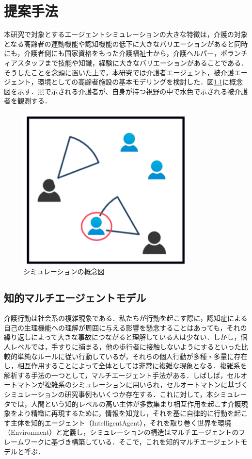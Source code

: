 \chapter{提案手法}

本研究で対象とするエージェントシミュレーションの大きな特徴は，介護の対象となる高齢者の運動機能や認知機能の低下に大きなバリエーションがあると同時にも，介護者側にも国家資格をもった介護福祉士から，介護ヘルパー，ボランチィアスタッフまで技能や知識，経験に大きなバリエーションがあることである．そうしたことを念頭に置いた上で，本研究では介護者エージェント，被介護エージェント，環境としての高齢者施設の基本モデリングを検討した．図\ref{concept_simulation}に概念図を示す．黒で示される介護者が、自身が持つ視野の中で水色で示される被介護者を観測する．

\begin{figure}[htb]
\begin{center}
\includegraphics[scale=0.6]{figures/concept_simulation.png}
\caption[シミュレーションの概念図]{シミュレーションの概念図 \label{concept_simulation}}
\end{center}
\end{figure}

\section{知的マルチエージェントモデル}

介護行動は社会系の複雑現象である．私たちが行動を起こす際に，認知症による自己の生理機能への理解が周囲に与える影響を懸念することはあっても，それの繰り返しによって大きな事故につながると理解している人は少ない．しかし，個人レベルでは，手すりに捕まる，他の歩行者に接触しないようにするといった比較的単純なルールに従い行動しているが，それらの個人行動が多種・多量に存在し，相互作用することによって全体としては非常に複雑な現象となる．複雑系を解析する手法の一つとして，マルチエージェント手法がある．しばしば，セルオートマトンが複雑系のシミュレーションに用いられ，セルオートマトンに基づくシミュレーションの研究事例もいくつか存在する．これに対して，本シミュレータでは，人間という知的レベルの高い主体が多数集まり相互作用を起こす介護現象をより精緻に再現するために，情報を知覚し，それを基に自律的に行動を起こす主体を知的エージェント（IntelligentAgent），それを取り巻く世界を環境（Environment）と定義し，シミュレーションの構造はマルチエージェントのフレームワークに基づき構築している．そこで，これを知的マルチエージェントモデルと呼ぶ．

